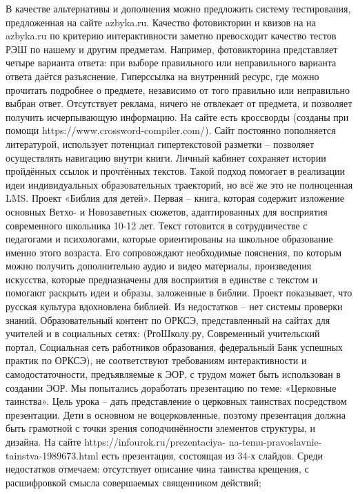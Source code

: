 В качестве альтернативы и дополнения можно предложить систему тестирования, предложенная на сайте azbyka.ru. Качество фотовикторин и квизов на на azbyka.ru по критерию интерактивности заметно превосходит качество тестов РЭШ по нашему и другим предметам. Например, фотовикторина представляет четыре варианта ответа: при выборе правильного или неправильного варианта ответа даётся разъяснение. Гиперссылка на внутренний ресурс, где можно прочитать подробнее о предмете, независимо от того правильно или неправильно выбран ответ. Отсутствует реклама, ничего не отвлекает от предмета, и позволяет получить исчерпывающую информацию. На сайте есть кроссворды (созданы при помощи https://www.crossword-compiler.com/). Сайт постоянно пополняется литературой, использует потенциал гипертекстовой разметки – позволяет осуществлять навигацию внутри книги. Личный кабинет сохраняет истории пройдённых ссылок и прочтённых текстов. Такой подход помогает в реализации идеи индивидуальных образовательных траекторий, но всё же это не полноценная LMS.
Проект «Библия для детей»\cite{15}. Первая – книга, которая содержит изложение основных Ветхо- и Новозаветных сюжетов, адаптированных для восприятия современного школьника 10-12 лет. Текст готовится в сотрудничестве с педагогами и психологами, которые ориентированы на школьное образование именно этого возраста. Его сопровождают необходимые пояснения, по которым можно получить дополнительно аудио и видео материалы, произведения искусства, которые предназначены для восприятия в единстве с текстом и помогают раскрыть идеи и образы, заложенные в библии. Проект показывает, что русская культура вдохновлена библией. Из недостатков – нет системы проверки знаний.
Образовательный контент по ОРКСЭ, представленный на сайтах для учителей и в социальных сетях: (РгоШколу.ру, Современный учительский портал, Социальная сеть работников образования, федеральный Банк успешных практик по ОРКСЭ), не соответствуют требованиям интерактивности и самодостаточности, предъявляемые к ЭОР, с трудом может быть использован в создании ЭОР. 
Мы попытались доработать презентацию по теме: «Церковные таинства». Цель урока – дать представление о церковных таинствах посредством презентации. Дети в основном не воцерковленные, поэтому презентация должна быть грамотной с точки зрения соподчинённости элементов структуры, и дизайна. На сайте https://infourok.ru/prezentaciya- na-temu-pravoslavnie-tainstva-1989673.html есть презентация, состоящая из 34-х слайдов. Среди недостатков отмечаем:
отсутствует описание чина таинства крещения, с расшифровкой смысла совершаемых священником действий;
